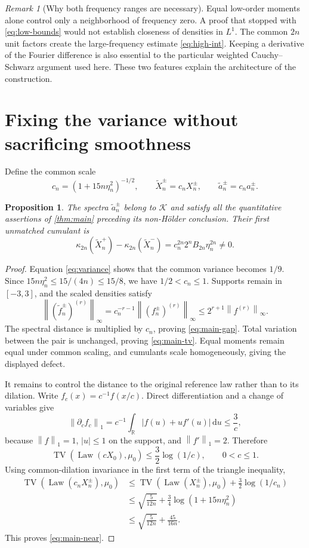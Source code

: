 \documentclass[11pt,a4paper]{article}
\newtheorem{proposition}[theorem]{Proposition}
\theoremstyle{definition}
\theoremstyle{remark}
\newtheorem{remark}[theorem]{Remark}
\DeclareMathOperator{\TV}{TV}
\DeclareMathOperator{\Law}{Law}
\newcommand{\R}{\mathbb R}
\newcommand{\K}{\mathcal K}
\newcommand{\dd}{\,\mathrm d}
\newcommand{\norm}[1]{\left\lVert #1\right\rVert}
\begin{document}
\begin{remark}[Why both frequency ranges are necessary]
Equal low-order moments alone control only a neighborhood of frequency
zero. A proof that stopped with \eqref{eq:low-bounds} would not establish
closeness of densities in $L^1$. The common $2n$ unit factors create the
large-frequency estimate \eqref{eq:high-int}. Keeping a derivative of the
Fourier difference is also essential to the particular weighted
Cauchy--Schwarz argument used here. These two features explain the
architecture of the construction.
\end{remark}

\section{Fixing the variance without sacrificing smoothness}
\label{sec:fixed}

Define the common scale
\begin{equation}\label{eq:cn}
 c_n=(1+15n\eta_n^2)^{-1/2},\qquad
 \widetilde X_n^\pm=c_nX_n^\pm,\qquad
 \widetilde a_n^\pm=c_na_n^\pm.
\end{equation}

\begin{proposition}\label{prop:normalized}
The spectra $\widetilde a_n^\pm$ belong to $\K$ and satisfy all the
quantitative assertions of \cref{thm:main} preceding its non-H\"older
conclusion. Their first unmatched cumulant is
\[
 \kappa_{2n}(\widetilde X_n^+)-\kappa_{2n}(\widetilde X_n^-)
        =c_n^{2n}2^n B_{2n}\eta_n^{2n}\ne0.
\]
\end{proposition}

\begin{proof}
Equation \eqref{eq:variance} shows that the common variance becomes $1/9$.
Since $15n\eta_n^2\le15/(4n)\le15/8$, we have $1/2<c_n\le1$.
Supports remain in $[-3,3]$, and the scaled densities satisfy
\[
 \norm{(\widetilde f_n^\pm)^{(r)}}_\infty
 =c_n^{-r-1}\norm{(f_n^\pm)^{(r)}}_\infty
 \le2^{r+1}\norm{f^{(r)}}_\infty.
\]
The spectral distance is multiplied by $c_n$, proving
\eqref{eq:main-gap}. Total variation between the pair is unchanged,
proving \eqref{eq:main-tv}. Equal moments remain equal under common
scaling, and cumulants scale homogeneously, giving the displayed defect.

It remains to control the distance to the original reference law rather
than to its dilation. Write $f_c(x)=c^{-1}f(x/c)$. Direct differentiation
and a change of variables give
\[
 \norm{\partial_c f_c}_1
 =c^{-1}\int_\R|f(u)+uf'(u)|\dd u
 \le \frac3c,
\]
because $\norm{f}_1=1$, $|u|\le1$ on the support, and $\norm{f'}_1=2$.
Therefore
\[
 \TV(\Law(cX_0),\mu_0)\le\frac32\log(1/c),\qquad0<c\le1.
\]
Using common-dilation invariance in the first term of the triangle
inequality,
\begin{align*}
 \TV(\Law(c_nX_n^\pm),\mu_0)
 &\le\TV(\Law(X_n^\pm),\mu_0)
                +\frac32\log(1/c_n)\\
 &\le\sqrt{\frac5{12n}}
                +\frac34\log(1+15n\eta_n^2)\\
 &\le\sqrt{\frac5{12n}}+\frac{45}{16n}.
\end{align*}
This proves \eqref{eq:main-near}.
\end{proof}
\end{document}
